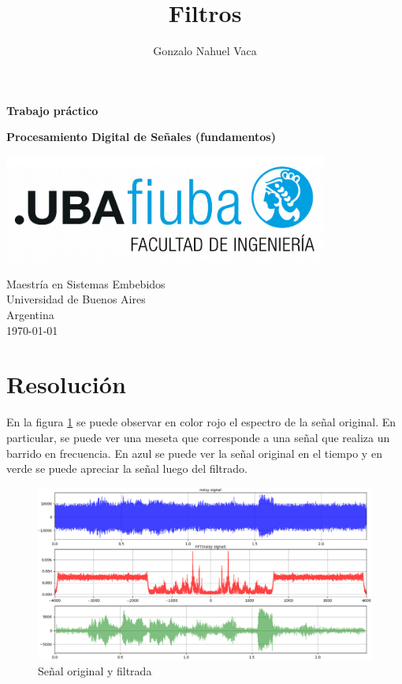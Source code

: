 \documentclass[
    11pt,
    spanish,
	a4paper
]{article}
\title{Filtros}
\author{Gonzalo Nahuel Vaca}
\def\doctype{Trabajo práctico}
\begin{document}
\makeatletter
\begin{titlepage}
	\begin{center}
		\vspace*{1cm}
		
		\Huge
		\textbf{\doctype}
		\vspace{0.5cm}
    
		\LARGE
		\@title
		\vspace{0.5cm}
    
		\textbf{Procesamiento Digital de Señales (fundamentos)}
		
		\vspace{1.5cm}
		
		\textbf{\@author}

		\vspace{1.5cm}

		\includegraphics[width=0.8\textwidth]{img/logoFIUBA.pdf}
		
		\vfill
		Maestría en Sistemas Embebidos\\
		Universidad de Buenos Aires\\
		Argentina\\
		\today
	\end{center}
\end{titlepage}
\makeatother
\newpage

\section{Resolución}

En la figura \ref{fig:filtertest} se puede observar en color rojo el espectro de la señal original.
En particular, se puede ver una meseta que corresponde a una señal que realiza un barrido en frecuencia.
En azul se puede ver la señal original en el tiempo y en verde se puede apreciar la señal luego del filtrado.

\begin{figure}[htbp]
	\centering
	\includegraphics[width=\textwidth]{img/filterTest.png}
	\caption{Señal original y filtrada}
	\label{fig:filtertest}
\end{figure}
\end{document}
